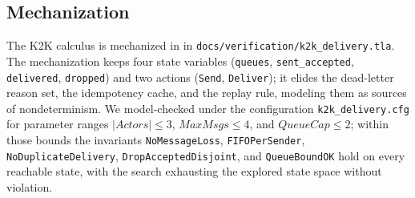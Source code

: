 \subsection{Mechanization}
\label{sec:k2k:mechanization}

The K2K calculus is mechanized in \TLA{} in
\texttt{docs/verification/k2k\_delivery.tla}.  The mechanization
keeps four state variables (\texttt{queues}, \texttt{sent\_accepted},
\texttt{delivered}, \texttt{dropped}) and two actions (\texttt{Send},
\texttt{Deliver}); it elides the dead-letter reason set, the
idempotency cache, and the replay rule, modeling them as sources of
nondeterminism.  We model-checked under the configuration
\texttt{k2k\_delivery.cfg} for parameter ranges
\(|\textit{Actors}| \le 3\), \(\textit{MaxMsgs} \le 4\), and
\(\textit{QueueCap} \le 2\); within those bounds the invariants
\texttt{NoMessageLoss}, \texttt{FIFOPerSender},
\texttt{NoDuplicateDelivery}, \texttt{DropAcceptedDisjoint}, and
\texttt{QueueBoundOK} hold on every reachable state, with the search
exhausting the explored state space without violation.
